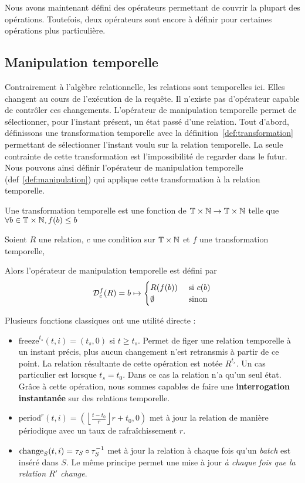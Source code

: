 Nous avons maintenant défini des opérateurs permettant de couvrir la plupart des opérations. Toutefois, deux opérateurs sont encore à définir pour certaines opérations plus particulière.
\subsection{Manipulation temporelle}\label{sec:contrib:astral:manipulation}
Contrairement à l'algèbre relationnelle, les relations sont temporelles ici. Elles changent au cours de l'exécution de la requête. Il n'existe pas d'opérateur capable de contrôler ces changements. L'opérateur de manipulation temporelle permet de sélectionner, pour l'instant présent, un état passé d'une relation. Tout d'abord, définissons une transformation temporelle avec la définition~\ref{def:transformation} permettant de sélectionner l'instant voulu sur la relation temporelle. La seule contrainte de cette transformation est l'impossibilité de regarder dans le futur. Nous pouvons ainsi définir l'opérateur de manipulation temporelle (def~\ref{def:manipulation}) qui applique cette transformation à la relation temporelle.
\begin{defi}\label{def:transformation}
    Une transformation temporelle est une fonction de $\mathbb{T}\times\mathbb{N}\to\mathbb{T}\times\mathbb{N}$ telle que $\forall b\in\mathbb{T}\times\mathbb{N}, f(b) \leq b$
\end{defi}

\begin{defi}\label{def:manipulation}
    Soient $R$ une relation, $c$ une condition sur $\mathbb{T}\times\mathbb{N}$ et $f$ une transformation temporelle,

    Alors l'opérateur de manipulation temporelle est défini par $$\mathcal{D}_c^f(R) = b \mapsto \begin{cases} R(f(b)) & \textrm{ si } c(b) \\ \emptyset & \textrm{ sinon}\end{cases}$$
\end{defi}

Plusieurs fonctions classiques ont une utilité directe :
\begin{itemize}
 \item $\mathrm{freeze}^{t_s}(t,i)=(t_s,0)$ si $t \geq t_s$. Permet de figer une relation temporelle à un instant précis, plus aucun changement n'est retransmis à partir de ce point. La relation résultante de cette opération est notée $R^{t_s}$. Un cas particulier est lorsque $t_s=t_0$. Dans ce cas la relation n'a qu'un seul état. Grâce à cette opération, nous sommes capables de faire une \textbf{interrogation instantanée} sur des relations temporelle.
 \item $\mathrm{period}^r(t,i)=\left(\left\lfloor\frac{t-t_0}{r}\right\rfloor r + t_0, 0\right)$ met à jour la relation de manière périodique avec un taux de rafraîchissement $r$.
 \item $\mathrm{change}_S(t,i)=\tau_S\circ\tau^{-1}_S$ met à jour la relation à chaque fois qu'un \textit{batch} est inséré dans $S$. Le même principe permet une mise à jour \textit{à chaque fois que la relation $R'$ change}.
\end{itemize}

